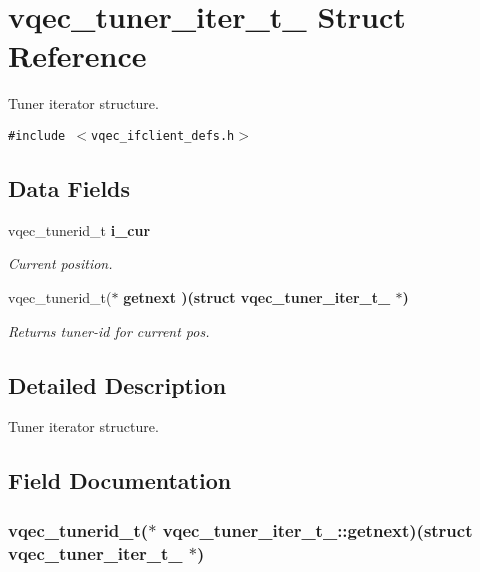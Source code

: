 \section{vqec\_\-tuner\_\-iter\_\-t\_\- Struct Reference}
\label{structvqec__tuner__iter__t__}
Tuner iterator structure.  


{\tt \#include $<$vqec\_\-ifclient\_\-defs.h$>$}

\subsection*{Data Fields}
\begin{CompactItemize}
\item 
vqec\_\-tunerid\_\-t \bf{i\_\-cur}
\begin{CompactList}\small\item\em Current position. \item\end{CompactList}\item 
vqec\_\-tunerid\_\-t($\ast$ \bf{getnext} )(struct \bf{vqec\_\-tuner\_\-iter\_\-t\_\-} $\ast$)
\begin{CompactList}\small\item\em Returns tuner-id for current pos. \item\end{CompactList}\end{CompactItemize}


\subsection{Detailed Description}
Tuner iterator structure. 



\subsection{Field Documentation}
\subsubsection{\setlength{\rightskip}{0pt plus 5cm}vqec\_\-tunerid\_\-t($\ast$ \bf{vqec\_\-tuner\_\-iter\_\-t\_\-::getnext})(struct \bf{vqec\_\-tuner\_\-iter\_\-t\_\-} $\ast$)}\label{structvqec__tuner__iter__t___865a18d1e5cb845cca23a7d3ec1d6cef}


